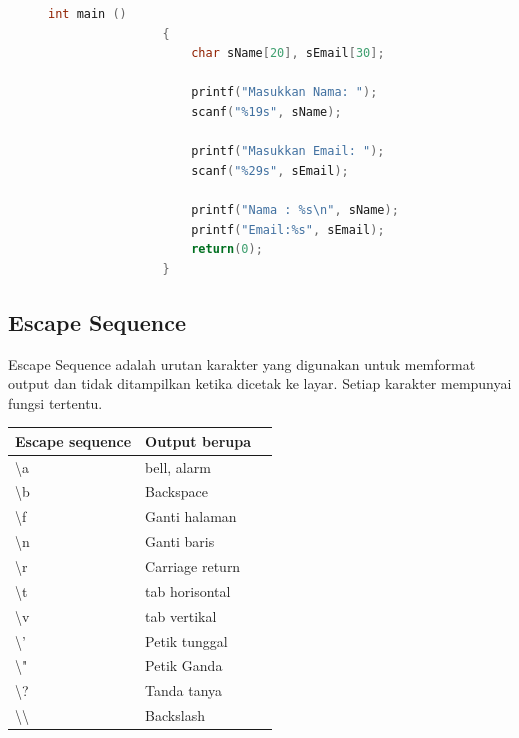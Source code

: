 \begin{description}
\begin{figure}[H]
\begin{lstlisting}[language=c]
				int main () 
				{
					char sName[20], sEmail[30];
					
					printf("Masukkan Nama: ");
					scanf("%19s", sName);
					
					printf("Masukkan Email: ");
					scanf("%29s", sEmail);
					
					printf("Nama : %s\n", sName);
					printf("Email:%s", sEmail);
					return(0);
				}
			\end{lstlisting}
		\end{figure}
\end{description}


\subsection{Escape Sequence}
Escape Sequence adalah urutan karakter yang digunakan untuk memformat output dan tidak ditampilkan ketika dicetak ke layar. Setiap karakter mempunyai fungsi tertentu.

\begin{table}[H]
	\centering
	\begin{tabular}{|l|l|l|}
		\hline
		\textbf{Escape sequence}         & \textbf{Output berupa} \\ \hline
		\textbackslash{}a                & bell, alarm     	      \\ \hline
		\textbackslash{}b                & Backspace       	      \\ \hline
		\textbackslash{}f                & Ganti halaman   	      \\ \hline
		\textbackslash{}n                & Ganti baris     	      \\ \hline
		\textbackslash{}r                & Carriage return 	      \\ \hline
		\textbackslash{}t                & tab horisontal  	      \\ \hline
		\textbackslash{}v                & tab vertikal    	      \\ \hline
		\textbackslash{}'                & Petik tunggal   	      \\ \hline
		\textbackslash{}"                & Petik Ganda     	      \\ \hline
		\textbackslash{}?                & Tanda tanya     	      \\ \hline
		\textbackslash{}\textbackslash{} & Backslash       	      \\ \hline
	\end{tabular}
\end{table}


